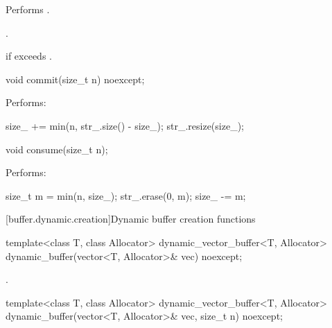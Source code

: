 \begin{itemdescr}
\pnum
\effects Performs .

\pnum
\returns {}.

\pnum
\changed{\remarks}{\throws}  if  exceeds .
\end{itemdescr}

%
\begin{itemdecl}
void commit(size_t n) noexcept;
\end{itemdecl}

\begin{itemdescr}
\pnum
\effects Performs:
\begin{codeblock}
size_ += min(n, str_.size() - size_);
str_.resize(size_);
\end{codeblock}

\end{itemdescr}

%
\begin{itemdecl}
void consume(size_t n);
\end{itemdecl}

\begin{itemdescr}
\pnum
\effects Performs:
\begin{codeblock}
size_t m = min(n, size_);
str_.erase(0, m);
size_ -= m;
\end{codeblock}

\end{itemdescr}



[buffer.dynamic.creation]{Dynamic buffer creation functions}

%
\begin{itemdecl}
template<class T, class Allocator>
  dynamic_vector_buffer<T, Allocator>
  dynamic_buffer(vector<T, Allocator>& vec) noexcept;
\end{itemdecl}

\begin{itemdescr}
\pnum
\returns {}.
\end{itemdescr}

\begin{itemdecl}
template<class T, class Allocator>
  dynamic_vector_buffer<T, Allocator>
  dynamic_buffer(vector<T, Allocator>& vec, size_t n) noexcept;
\end{itemdecl}

